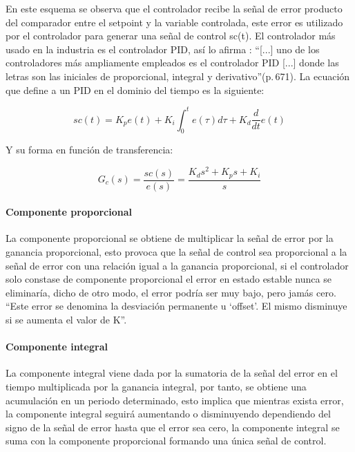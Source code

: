 			En este esquema se observa que el controlador recibe la señal de error producto del comparador entre el setpoint y la variable controlada, este error es utilizado por el controlador para generar una señal de control sc(t). El controlador más usado en la industria es el controlador PID, así lo afirma \textcite{kuo1996sistemas}: \enquote{[...] uno de los controladores más ampliamente empleados es el controlador PID [...] donde las letras son las iniciales de proporcional, integral y derivativo}(p.$\,$671). La ecuación que define a un PID en el dominio del tiempo es la siguiente:
			
			\begin{equation}\label{eq:pidtiempo}
				sc(t) = K_{p}e(t)+  K_{i}\int_{0}^{t} e(\tau) d\tau + K_{d} \frac{d}{dt}e(t)
			\end{equation}
			
			Y su forma en función de transferencia:
			
			\begin{equation}\label{eq:pidcompleja}
				G_{c}(s) = \frac{sc(s)}{e(s)} = \frac{K_{d}s^{2} + K_{p}s +  K_{i}}{s}
			\end{equation}
			
			\paragraph{Componente proporcional}

				La componente proporcional se obtiene de multiplicar la señal de error por la ganancia proporcional, esto provoca que la señal de control sea proporcional a la señal de error con una relación igual a la ganancia proporcional, si el controlador solo constase de componente proporcional el error en estado estable nunca se eliminaría, dicho de otro modo, el error podría ser muy bajo, pero jamás cero. \enquote{Este error se denomina la desviación permanente u \enquote{offset}. El mismo disminuye si se aumenta el valor de K}\Parencite[p.$\,$54]{nelson1999fundamentos}.

			\paragraph{Componente integral}

				La componente integral viene dada por la sumatoria de la señal del error en el tiempo multiplicada por la ganancia integral, por tanto, se obtiene una acumulación en un periodo determinado, esto implica que mientras exista error, la componente integral seguirá aumentando o disminuyendo dependiendo del signo de la señal de error hasta que el error sea cero, la componente integral se suma con la componente proporcional formando una única señal de control.

